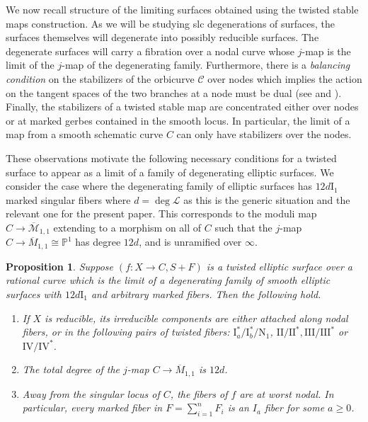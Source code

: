 \documentclass[11pt]{amsart}
\newtheorem{prop}[theorem]{Proposition}
\theoremstyle{definition}
\theoremstyle{remark}
\newcommand{\calM}{\mathcal M}
\newcommand{\calC}{\mathcal C}
\begin{document}
	We now recall structure of the limiting surfaces obtained using the twisted stable maps construction. As we will be studying slc degenerations of surfaces, the surfaces themselves will degenerate into possibly reducible surfaces. The degenerate surfaces will carry a fibration over a nodal curve whose $j$-map is the limit of the $j$-map of the degenerating family. Furthermore, there is a \emph{balancing condition} on the stabilizers of the orbicurve $\calC$ over nodes which implies the action on the tangent spaces of the two branches at a node must be dual (see \cite[Definition 3.2.4]{av} and \cite{olsson}). Finally, the stabilizers of a twisted stable map are concentrated either over nodes or at marked gerbes contained in the smooth locus. In particular, the limit of a map from a smooth schematic curve $C$ can only have stabilizers over the nodes. 
	
	These observations motivate the following necessary conditions for a twisted surface to appear as a limit of a family of degenerating elliptic surfaces. We consider the case where the degenerating family of elliptic surfaces has $12d\mathrm{I}_1$ marked singular fibers where $d = \deg \mathscr{L}$ as this is the generic situation and the relevant one for the present paper. This corresponds to the moduli map $C \to \overline{\calM}_{1,1}$ extending to a morphism on all of $C$ such that the $j$-map $C \to \overline{M}_{1,1} \cong \mathbb{P}^1$ has degree $12d$, and is unramified over $\infty$. 
	
	\begin{prop}\label{prop:tsm}\leavevmode Suppose $(f:X \to C, S+F)$ is a twisted elliptic surface \cite{tsm} over a rational curve which is the limit of a degenerating family of smooth elliptic surfaces with $12d\mathrm{I}_1$ and arbitrary marked fibers. Then the following hold. 
		\begin{enumerate}
			\item If $X$ is reducible, its irreducible components are either attached along nodal fibers, or in the following pairs of twisted fibers: $\mathrm{I}_a^*/\mathrm{I}_b^*/\mathrm{N}_1$, $\mathrm{II}/\mathrm{II}^*, \mathrm{III}/\mathrm{III}^*$ or $\mathrm{IV}/\mathrm{IV}^*$. 
			\item The total degree of the $j$-map $C \to \overline{M}_{1,1}$ is $12d$.
			\item Away from the singular locus of $C$, the fibers of $f$ are at worst nodal. In particular, every marked fiber in $F = \sum_{i = 1}^n F_i$ is an $I_a$ fiber for some $a \geq 0$. 
	\end{enumerate}\end{prop}
	
\end{document}
